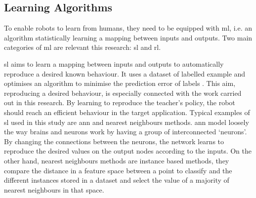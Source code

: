 %
%
%
%
%

\subsection{Learning Algorithms}
To enable robots to learn from humans, they need to be equipped with \acrfull{ml}, i.e. an algorithm statistically learning a mapping between inputs and outputs. Two main categories of \gls{ml} are relevant this research: \gls{sl} and \gls{rl}.

\gls{sl} aims to learn a mapping between inputs and outputs to automatically reproduce a desired known behaviour. It uses a dataset of labelled example and optimises an algorithm to minimise the prediction error of labels \citep{russell2016artificial}. This aim, reproducing a desired behaviour, is especially connected with the work carried out in this research. By learning to reproduce the teacher's policy, the robot should reach an efficient behaviour in the target application. Typical examples of \gls{sl} used in this study are \gls{ann} and nearest neighbours methods. \gls{ann} model loosely the way brains and neurons work by having a group of interconnected `neurons'. By changing the connections between the neurons, the network learns to reproduce the desired values on the output nodes according to the inputs. On the other hand, nearest neighbours methods are instance based methods, they compare the distance in a feature space between a point to classify and the different instances stored in a dataset and select the value of a majority of nearest neighbours in that space.

